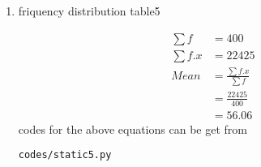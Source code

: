\renewcommand{\theequation}{\theenumi}
\begin{enumerate}[label=\arabic*.,ref=\thesubsection.\theenumi]
\item \begin{table}[!ht]
	\centering
	
	\caption{friquency distribution table5 }
\end{table}
\begin{align}
\sum{f} &= 400
\\
\sum{f.x} &= 22425
\\
Mean &= \frac{\sum{f.x}}{\sum{f}}
\\ &= \frac{22425}{400}
\\&= 56.06
\end{align}
codes for the above equations can be get from
\begin{lstlisting}
codes/static5.py
\end{lstlisting}
\end{enumerate}